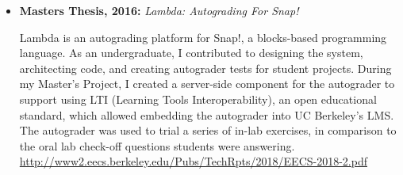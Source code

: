 \begin{itemize}

  \setlength\itemsep{1em}
  
  \item \textbf{Masters Thesis, 2016:} \textit{Lambda: Autograding For Snap!}

    \small{Lambda is an autograding platform for Snap!, a blocks-based programming language. As an undergraduate, I contributed to designing the system, architecting code, and creating autograder tests for student projects. During my Master's Project, I created a server-side component for the autograder to support using LTI (Learning Tools Interoperability), an open educational standard, which allowed embedding the autograder into UC Berkeley's LMS. The autograder was used to trial a series of in-lab exercises, in comparison to the oral lab check-off questions students were answering.}
    \linebreak
    \small{\href{http://www2.eecs.berkeley.edu/Pubs/TechRpts/2018/EECS-2018-2.pdf}{http://www2.eecs.berkeley.edu/Pubs/TechRpts/2018/EECS-2018-2.pdf}}

\end{itemize}

\vspace{2pt}